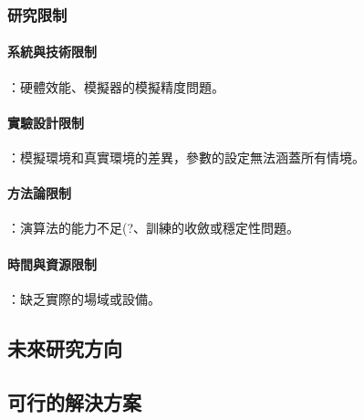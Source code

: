 \documentclass[12pt,a4paper]{article}
\begin{document}
\subsubsection{研究限制}
\paragraph{系統與技術限制}：硬體效能、模擬器的模擬精度問題。

\paragraph{實驗設計限制}：模擬環境和真實環境的差異，參數的設定無法涵蓋所有情境。

\paragraph{方法論限制}：演算法的能力不足(?、訓練的收斂或穩定性問題。

\paragraph{時間與資源限制}：缺乏實際的場域或設備。

\subsection{未來研究方向}

\subsection{可行的解決方案}
\end{document}
